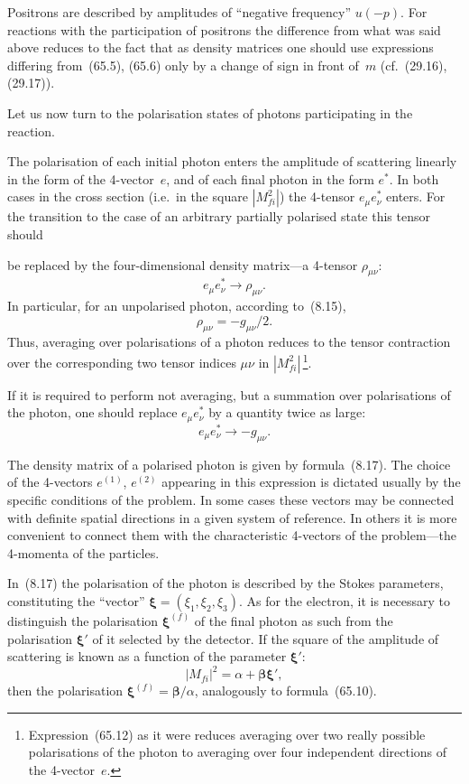 Positrons are described by amplitudes of ``negative frequency'' $u(-p)$. For reactions with the participation of positrons the difference from what was said above reduces to the fact that as density matrices one should use expressions differing from~(65.5), (65.6) only by a change of sign in front of~$m$ (cf.~(29.16), (29.17)).

Let us now turn to the polarisation states of photons participating in the reaction.

The polarisation of each initial photon enters the amplitude of scattering linearly in the form of the 4-vector~$e$, and of each final photon in the form $e^*$. In both cases in the cross section (i.e.\ in the square $|M^2_{fi}|$) the 4-tensor $e_\mu e^*_\nu$ enters. For the transition to the case of an arbitrary partially polarised state this tensor should

be replaced by the four-dimensional density matrix---a 4-tensor $\rho_{\mu\nu}$:
\begin{equation}
e_\mu e^*_\nu \to \rho_{\mu\nu}.
\tag{65.11}
\end{equation}
In particular, for an unpolarised photon, according to~(8.15),
\begin{equation}
\rho_{\mu\nu} = -g_{\mu\nu}/2.
\tag{65.12}
\end{equation}
Thus, averaging over polarisations of a photon reduces to the tensor contraction over the corresponding two tensor indices $\mu\nu$ in $|M^2_{fi}|$\,\footnote{Expression~(65.12) as it were reduces averaging over two really possible polarisations of the photon to averaging over four independent directions of the 4-vector~$e$.}.

If it is required to perform not averaging, but a summation over polarisations of the photon, one should replace $e_\mu e^*_\nu$ by a quantity twice as large:
\begin{equation}
e_\mu e^*_\nu \to -g_{\mu\nu}.
\tag{65.13}
\end{equation}

The density matrix of a polarised photon is given by formula~(8.17). The choice of the 4-vectors $e^{(1)}$, $e^{(2)}$ appearing in this expression is dictated usually by the specific conditions of the problem. In some cases these vectors may be connected with definite spatial directions in a given system of reference. In others it is more convenient to connect them with the characteristic 4-vectors of the problem---the 4-momenta of the particles.

In~(8.17) the polarisation of the photon is described by the Stokes parameters, constituting the ``vector'' $\boldsymbol{\xi} = (\xi_1, \xi_2, \xi_3)$. As for the electron, it is necessary to distinguish the polarisation $\boldsymbol{\xi}^{(f)}$ of the final photon as such from the polarisation $\boldsymbol{\xi}'$ of it selected by the detector. If the square of the amplitude of scattering is known as a function of the parameter $\boldsymbol{\xi}'$:
\begin{equation}
|M_{fi}|^2 = \alpha + \boldsymbol{\beta}\boldsymbol{\xi}',
\end{equation}
then the polarisation $\boldsymbol{\xi}^{(f)} = \boldsymbol{\beta}/\alpha$, analogously to formula~(65.10).
